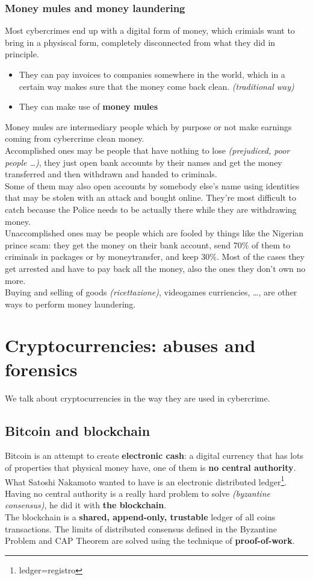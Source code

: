     \subsection{Money mules and money laundering}
        Most cybercrimes end up with a digital form of money, which crimials want to bring in a physiscal form, completely disconnected from what they did in principle.
        \begin{itemize}
            \item They can pay invoices to companies somewhere in the world, which in a certain way makes sure that the money come back clean. \textit{(traditional way)}
            \item They can make use of \textbf{money mules}
        \end{itemize}
        Money mules are intermediary people which by purpose or not make earnings coming from cybercrime clean money.\\
        Accomplished ones may be people that have nothing to lose \textit{(prejudiced, poor people \dots)}, they just open bank accounts by their names and get the money transferred and then withdrawn and handed to criminals.\\
        Some of them may also open accounts by somebody else's name using identities that may be stolen with an attack and bought online. They're most difficult to catch because the Police needs to be actually there while they are withdrawing money.
        \\Unaccomplished ones may be people which are fooled by things like the Nigerian prince scam: they get the money on their bank account, send 70\% of them to criminals in packages or by moneytransfer, and keep 30\%. Most of the cases they get arrested and have to pay back all the money, also the ones they don't own no more.\\
        Buying and selling of goods \textit{(ricettazione)}, videogames curriencies, \dots, are other ways to perform money laundering.
\chapter{Cryptocurrencies: abuses and forensics}
    We talk about cryptocurrencies in the way they are used in cybercrime.
    \section{Bitcoin and blockchain}
        Bitcoin is an attempt to create \textbf{electronic cash}: a digital currency that has lots of properties that physical money have, one of them is \textbf{no central authority}.\\
        What Satoshi Nakamoto wanted to have is an electronic distributed ledger\footnote{ledger=registro}.\\
        Having no central authority is a really hard problem to solve \textit{(byzantine consensus)}, he did it with \textbf{the blockchain}.\\
        The blockchain is a \textbf{shared, append-only, trustable} ledger of all coins transactions. The limits of distributed consensus defined in the Byzantine Problem and CAP Theorem are solved using the technique of \textbf{proof-of-work}.
